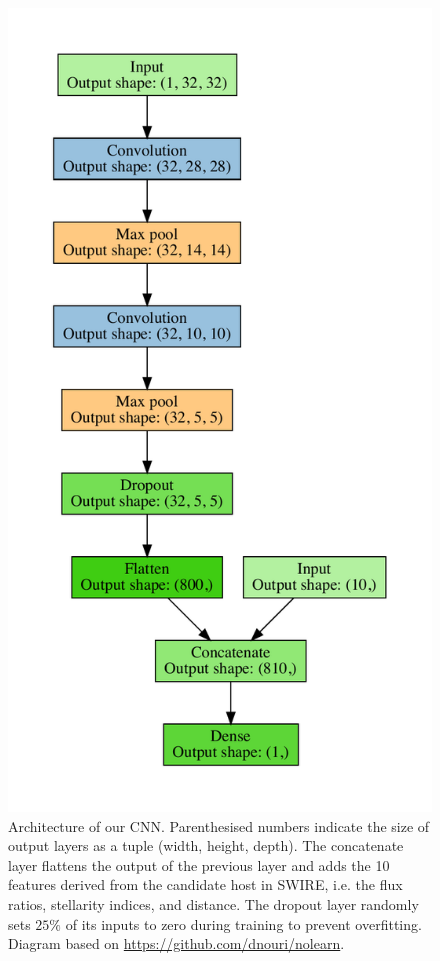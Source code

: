     \begin{figure}
      \centering
      \includegraphics[height=0.9\textheight]{atlas-images/cnn_model_graph}
      \caption[Architecture of our CNN.]{Architecture of our CNN. {Parenthesised numbers indicate
      the size of output layers as a tuple (width, height, depth).} The
      concatenate layer flattens the output of the previous layer and adds the
      10 features derived from the candidate host in SWIRE, i.e. the flux
      ratios, stellarity indices, and distance. The dropout layer randomly
      sets $25\%$ of its inputs to zero during training to prevent
      overfitting. Diagram based on \url{ https://github.com/dnouri/nolearn}.}
      \label{fig:cnn}
    \end{figure}

